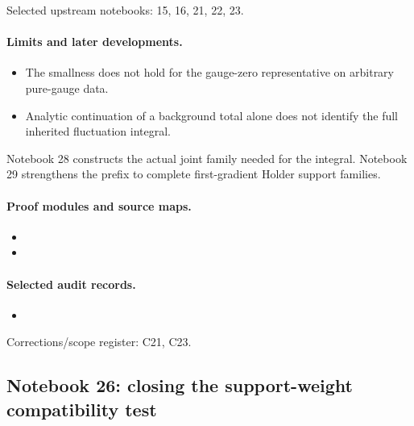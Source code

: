 Selected upstream notebooks: 15, 16, 21, 22, 23.\par

\paragraph{Limits and later developments.}
\begin{itemize}
\item The smallness does not hold for the gauge-zero representative on arbitrary pure-gauge data.
\item Analytic continuation of a background total alone does not identify the full inherited fluctuation integral.
\end{itemize}

Notebook 28 constructs the actual joint family needed for the integral. Notebook 29 strengthens the prefix to complete first-gradient Holder support families.

\paragraph{Proof modules and source maps.}
\begingroup\small
\begin{itemize}
\item {}
\item {}
\end{itemize}
\endgroup

\paragraph{Selected audit records.}
\begingroup\small
\begin{itemize}
\item {}
\end{itemize}
\endgroup
Corrections/scope register: C21, C23.\par

\subsection{Notebook 26: closing the support-weight compatibility test}
\label{hnc-26}
\noindent{}\par

